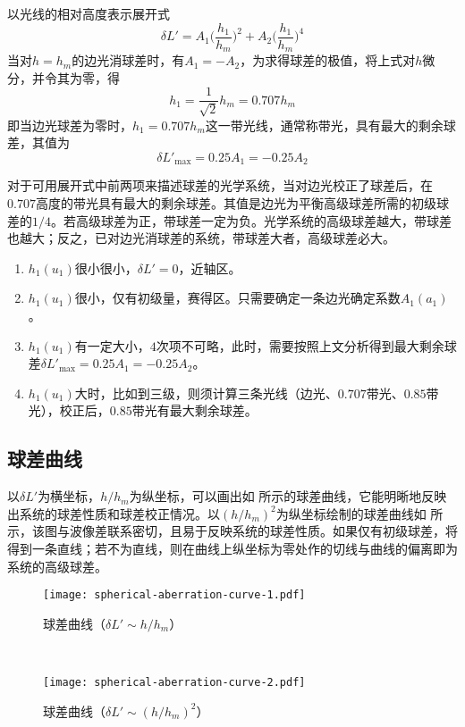 \documentclass[cn,10pt,chinesefont=founder,math=mtpro2,cite=super,toc=onecol,twoside,openany]{elegantbook}
\begin{document}
以光线的相对高度表示展开式
\begin{equation}
\delta L'=A_1\bigg(\frac{h_1}{h_m}\bigg)^2+A_2\bigg(\frac{h_1}{h_m}\bigg)^4
\end{equation}
当对$h=h_m$的边光消球差时，有$A_1=-A_2$，为求得球差的极值，将上式对$h$微分，并令其为零，得
\begin{equation}
h_1=\frac{1}{\sqrt{2}}h_m=0.707h_m
\end{equation}
即当边光球差为零时，$h_1=0.707h_m$这一带光线，通常称带光，具有最大的剩余球差，其值为
\begin{equation}
\delta L'_{\max}=0.25A_1=-0.25A_2
\end{equation}
\begin{conclusion}
对于可用展开式中前两项来描述球差的光学系统，当对边光校正了球差后，在$0.707$高度的带光具有最大的剩余球差。其值是边光为平衡高级球差所需的初级球差的$1/4$。若高级球差为正，带球差一定为负。光学系统的高级球差越大，带球差也越大；反之，已对边光消球差的系统，带球差大者，高级球差必大。
\end{conclusion}
\begin{note}
	\begin{enumerate}
		\item $h_1(u_1)$很小很小，$\delta L'=0$，近轴区。
		\item $h_1(u_1)$很小，仅有初级量，赛得区。只需要确定一条边光确定系数$A_1(a_1)$。
		\item $h_1(u_1)$有一定大小，$4$次项不可略，此时，需要按照上文分析得到最大剩余球差$\delta L'_{\mathrm{max}}=0.25A_1=-0.25A_2$。
		\item $h_1(u_1)$大时，比如到三级，则须计算三条光线（边光、$0.707$带光、$0.85$带光），校正后，$0.85$带光有最大剩余球差。
	\end{enumerate}
\end{note}

\subsection{球差曲线}
以$\delta L'$为横坐标，$h/h_m$为纵坐标，可以画出如 所示的球差曲线，它能明晰地反映出系统的球差性质和球差校正情况。以$(h/h_m)^2$为纵坐标绘制的球差曲线如 所示，该图与波像差联系密切，且易于反映系统的球差性质。如果仅有初级球差，将得到一条直线；若不为直线，则在曲线上纵坐标为零处作的切线与曲线的偏离即为系统的高级球差。

\begin{figure}[htbp]
	\centering
	\begin{minipage}[t]{0.45\textwidth}
		\centering
		\texttt{[image: spherical-aberration-curve-1.pdf]}
		\caption{球差曲线（$\delta L'\sim h/h_m$）}
		\label{fig:spherical-aberration-curve-1}
	\end{minipage}
	\ 
	\begin{minipage}[t]{0.45\textwidth}
		\centering
		\texttt{[image: spherical-aberration-curve-2.pdf]}
		\caption{球差曲线（$\delta L'\sim (h/h_m)^2$）}
		\label{fig:spherical-aberration-curve-2}
	\end{minipage}
\end{figure}
\end{document}
